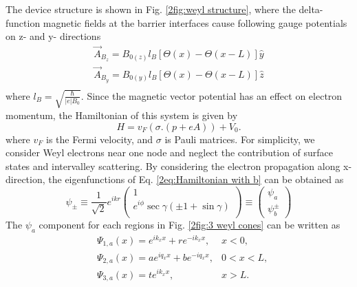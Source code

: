     The device structure is shown in Fig. \ref{2fig:weyl structure}, where the delta-function magnetic fields at the barrier interfaces cause following gauge potentials on z- and y- directions
    \begin{equation} \label{2eq:b field profiles}
        \begin{aligned}
            \vec{A}_{B_z} = B_{0(z)}l_B[\Theta(x)-\Theta(x-L)]\hat{y}\\
            \vec{A}_{B_y} = B_{0(y)}l_B[\Theta(x)-\Theta(x-L)]\hat{z}\\
        \end{aligned}
    \end{equation}
    where $l_B =  \sqrt{\frac{\hbar}{|e| B_0}}$. 
    Since the magnetic vector potential has an effect on electron momentum, the Hamiltonian of this system is given by
    \begin{equation} \label{2eq:Hamiltonian with b}
        H = v_F (\sigma . (p + eA) ) +V_0.
    \end{equation}
    where $v_F$ is the Fermi velocity, and $\sigma$ is Pauli matrices. 
    For simplicity, we consider Weyl electrons near one node and neglect the contribution of surface states and intervalley scattering.
    By considering the electron propagation along x-direction, the eigenfunctions of Eq. \ref{2eq:Hamiltonian with b} can be obtained as
    \begin{equation} \label{2eq:eigenfunctions b field}
        \psi_{\pm} \equiv \frac{1}{\sqrt{2}}e^{ikr} 
        \begin{pmatrix}
            1\\
            e^{i \phi} \sec{\gamma}(\pm 1 + \sin{\gamma})\\
        \end{pmatrix} \equiv
        \begin{pmatrix}
            \psi_a\\
            \psi_b^{\pm}
        \end{pmatrix}
    \end{equation}
    The $\psi_a$ component for each regions in Fig. \ref{2fig:3 weyl cones} can be written as
    \begin{equation} \label{2eq:a wavefunctions b field}
        \begin{aligned}
            &\Psi_{1,a}(x) = e^{ik_x x}+ r e^{-i k_x x}, &x<0,\\
            &\Psi_{2,a}(x) = ae^{i q_x x}+ b e^{-i q_x x}, &0<x<L,\\
            &\Psi_{3,a}(x) = te^{ik_x x}, &x>L.\\
        \end{aligned}
    \end{equation}
